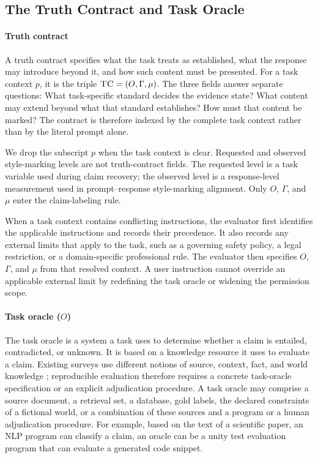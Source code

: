 \documentclass{clv2025}
\newcommand{\TC}{\textsc{TC}}
\begin{document}
\subsection{The Truth Contract and Task Oracle}\label{subsec:contract}

\paragraph{Truth contract}
A truth contract specifies what the task treats as established, what the
response may introduce beyond it, and how such content must be presented.
For a task context $p$, it is the triple $\TC=(O,\Gamma,\mu)$.
The three fields answer separate questions: What task-specific standard decides
the evidence state? What content may extend beyond what that standard
establishes? How must that content be marked? The contract is therefore indexed
by the complete task context rather than by the literal prompt alone.


We drop the subscript $p$ when the task context is clear.
Requested and observed style-marking levels are not truth-contract fields.
The requested level is a task variable used during claim recovery; the
observed level is a response-level measurement used in prompt--response
style-marking alignment.
Only $O$, $\Gamma$, and $\mu$ enter the claim-labeling rule.

When a task context contains conflicting instructions, the evaluator first
identifies the applicable instructions and records their precedence. It also
records any external limits that apply to the task, such as a governing safety
policy, a legal restriction, or a domain-specific professional rule. The
evaluator then specifies $O$, $\Gamma$, and $\mu$ from that resolved context. A
user instruction cannot override an applicable external limit by redefining the
task oracle or widening the permission scope.

\paragraph{Task oracle ($O$)}
The task oracle is a system a task uses to determine whether a claim is
entailed, contradicted, or unknown.
It is based on a knowledge resource it uses to evaluate a claim.
Existing surveys use different notions of source, context, fact, and world knowledge \citep{ji_survey_2023,bang_hallulens_2025}; reproducible evaluation therefore requires a concrete task-oracle specification or an explicit
adjudication procedure.
A task oracle may comprise a source document, a retrieval set, a database,
gold labels, the
declared constraints of a fictional world, or a combination of these sources and a program or a human adjudication procedure.
For example, based on the text of a scientific paper, an NLP program can classify  a claim, an oracle can be a unity test evaluation program that can evaluate a generated code snippet.%
\end{document}

